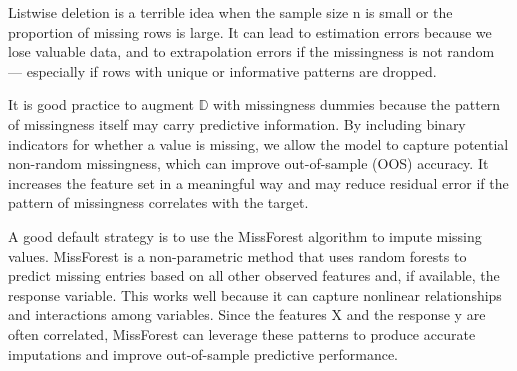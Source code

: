 \documentclass[12pt]{article}
\begin{document}
\begin{enumerate}


Listwise deletion is a terrible idea when the sample size n is small or the proportion of missing rows is large. It can lead to estimation errors because we lose valuable data, and to extrapolation errors if the missingness is not random — especially if rows with unique or informative patterns are dropped.



It is good practice to augment $\mathbb{D}$ with missingness dummies because the pattern of missingness itself may carry predictive information. By including binary indicators for whether a value is missing, we allow the model to capture potential non-random missingness, which can improve out-of-sample (OOS) accuracy. It increases the feature set in a meaningful way and may reduce residual error if the pattern of missingness correlates with the target.


A good default strategy is to use the MissForest algorithm to impute missing values. MissForest is a non-parametric method that uses random forests to predict missing entries based on all other observed features and, if available, the response variable. This works well because it can capture nonlinear relationships and interactions among variables. Since the features X and the response y are often correlated, MissForest can leverage these patterns to produce accurate imputations and improve out-of-sample predictive performance.


\end{enumerate}
%
%
\end{document}
